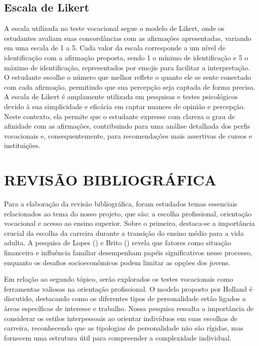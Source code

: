 \section{Escala de Likert }

A escala utilizada no teste vocacional segue o modelo de Likert, onde os estudantes avaliam suas concordâncias com as afirmações apresentadas, variando em uma escala de 1 a 5. Cada valor da escala corresponde a um nível de identificação com a afirmação proposta, sendo 1 o mínimo de identificação e 5 o máximo de identificação, representados por emojis para facilitar a interpretação. O estudante escolhe o número que melhor reflete o quanto ele se sente conectado com cada afirmação, permitindo que sua percepção seja captada de forma precisa. A escala de Likert é amplamente utilizada em pesquisas e testes psicológicos devido à sua simplicidade e eficácia em captar nuances de opinião e percepção. Neste contexto, ela permite que o estudante expresse com clareza o grau de afinidade com as afirmações, contribuindo para uma análise detalhada dos perfis vocacionais e, consequentemente, para recomendações mais assertivas de cursos e instituições. 

\chapter{REVISÃO BIBLIOGRÁFICA}

Para a elaboração da revisão bibliográfica, foram estudados temas essenciais relacionados ao tema do nosso projeto, que são: a escolha profissional, orientação vocacional e acesso ao ensino superior. Sobre o primeiro, destaca-se a importância crucial da escolha da carreira durante a transição do ensino médio para a vida adulta. A pesquisa de Lopes (\citeyear{lopes2022fim}) e Brito (\citeyear{lopes2022fim}) revela que fatores como situação financeira e influência familiar desempenham papéis significativos nesse processo, enquanto os desafios socioeconômicos podem limitar as opções dos jovens.

Em relação ao segundo tópico, serão explorados os testes vocacionais como ferramentas valiosas na orientação profissional. O modelo proposto por Holland é discutido, destacando como os diferentes tipos de personalidade estão ligados a áreas específicas de interesse e trabalho. Nossa pesquisa ressalta a importância de considerar os estilos interpessoais ao orientar indivíduos em suas escolhas de carreira, reconhecendo que as tipologias de personalidade não são rígidas, mas fornecem uma estrutura útil para compreender a complexidade individual.

